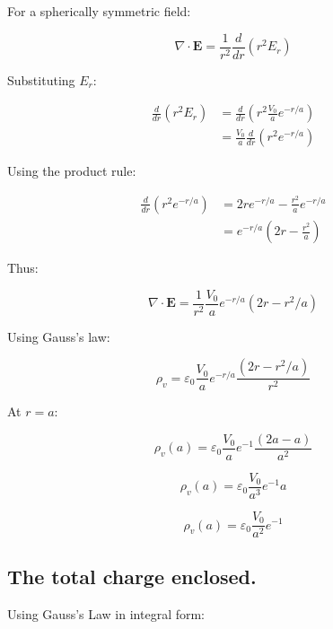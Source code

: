 \documentclass[a4paper,12pt]{article}
\begin{document}
For a spherically symmetric field:

\begin{equation}
\nabla \cdot \mathbf{E} = \frac{1}{r^2} \frac{d}{dr} \left( r^2 E_r \right)
\end{equation}

Substituting \( E_r \):

\begin{align}
\frac{d}{dr} \left( r^2 E_r \right) &= \frac{d}{dr} \left( r^2 \frac{V_0}{a} e^{-r/a} \right) \\
&= \frac{V_0}{a} \frac{d}{dr} \left( r^2 e^{-r/a} \right)
\end{align}

Using the product rule:

\begin{align}
\frac{d}{dr} (r^2 e^{-r/a}) &= 2r e^{-r/a} - \frac{r^2}{a} e^{-r/a} \\
&= e^{-r/a} \left( 2r - \frac{r^2}{a} \right)
\end{align}

Thus:

\begin{equation}
\nabla \cdot \mathbf{E} = \frac{1}{r^2} \frac{V_0}{a} e^{-r/a} (2r - r^2/a)
\end{equation}

Using Gauss’s law:

\begin{equation}
\boxed{\rho_v = \varepsilon_0 \frac{V_0}{a} e^{-r/a} \frac{(2r - r^2/a)}{r^2}}
\end{equation}

At \( r = a \):

\begin{equation}
\rho_v(a) = \varepsilon_0 \frac{V_0}{a} e^{-1} \frac{(2a - a)}{a^2}
\end{equation}

\begin{equation}
\rho_v(a) = \varepsilon_0 \frac{V_0}{a^3} e^{-1} a
\end{equation}

\begin{equation}
\boxed{\rho_v(a) = \varepsilon_0 \frac{V_0}{a^2} e^{-1}}
\end{equation}

\subsection{The total charge enclosed.}
Using Gauss's Law in integral form:
\end{document}
